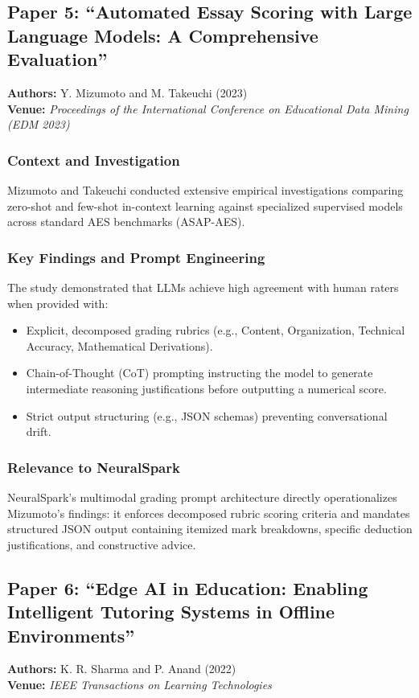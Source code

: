 \subsection{Paper 5: ``Automated Essay Scoring with Large Language Models: A Comprehensive Evaluation''}
\textbf{Authors:} Y. Mizumoto and M. Takeuchi (2023) \cite{mizumoto2023} \\
\textbf{Venue:} \textit{Proceedings of the International Conference on Educational Data Mining (EDM 2023)}

\subsubsection{Context and Investigation}
Mizumoto and Takeuchi conducted extensive empirical investigations comparing zero-shot and few-shot in-context learning against specialized supervised models across standard AES benchmarks (ASAP-AES).

\subsubsection{Key Findings and Prompt Engineering}
The study demonstrated that LLMs achieve high agreement with human raters when provided with:
\begin{itemize}[leftmargin=*]
    \item Explicit, decomposed grading rubrics (e.g., Content, Organization, Technical Accuracy, Mathematical Derivations).
    \item Chain-of-Thought (CoT) prompting instructing the model to generate intermediate reasoning justifications before outputting a numerical score.
    \item Strict output structuring (e.g., JSON schemas) preventing conversational drift.
\end{itemize}

\subsubsection{Relevance to NeuralSpark}
NeuralSpark's multimodal grading prompt architecture directly operationalizes Mizumoto's findings: it enforces decomposed rubric scoring criteria and mandates structured JSON output containing itemized mark breakdowns, specific deduction justifications, and constructive advice.

\subsection{Paper 6: ``Edge AI in Education: Enabling Intelligent Tutoring Systems in Offline Environments''}
\textbf{Authors:} K. R. Sharma and P. Anand (2022) \cite{sharma2022} \\
\textbf{Venue:} \textit{IEEE Transactions on Learning Technologies}

